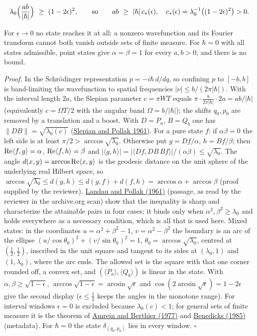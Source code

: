 \documentclass[11pt,a4paper]{article}
\begin{document}
\[\lambda_0\Bigl(\frac{ab}{|\hbar|}\Bigr)\ \ge\ (1-2\epsilon)^2,
\qquad\text{so}\qquad ab\ \ge\ |\hbar|\,c_*(\epsilon),\quad
c_*(\epsilon)=\lambda_0^{-1}\bigl((1-2\epsilon)^2\bigr)>0 .\]

For \(\epsilon\to0\) no state reaches it at all: a nonzero wavefunction
and its Fourier transform cannot both vanish outside sets of finite
measure. For \(\hbar=0\) with all states admissible, point states give
\(\alpha=\beta=1\) for every \(a,b>0\), and there is no bound.

\emph{Proof.} In the Schrödinger representation \(p=-i\hbar\,d/dq\), so
confining \(p\) to \([-b,b]\) is band-limiting the wavefunction to
spatial frequencies \(|\nu|\le b/(2\pi|\hbar|)\). With the interval
length \(2a\), the Slepian parameter \(c=\pi WT\) equals
\(\pi\cdot\frac b{2\pi|\hbar|}\cdot2a=ab/|\hbar|\) (equivalently
\(c=\Omega T/2\) with the angular band \(\Omega=b/|\hbar|\)); the shifts
\(q_0,p_0\) are removed by a translation and a boost. With \(D=P_a\),
\(B=Q_b\) one has \(\|DB\|=\sqrt{\lambda_0(c)}\)
(\href{https://doi.org/10.1002/j.1538-7305.1961.tb03976.x}{Slepian and
Pollak 1961}). For a pure state \(f\): if \(\alpha\beta=0\) the left
side is at least \(\pi/2>\arccos\sqrt{\lambda_0}\). Otherwise put
\(g=Df/\alpha\), \(h=Bf/\beta\); then
\({\rm Re}\langle f,g\rangle=\alpha\),
\({\rm Re}\langle f,h\rangle=\beta\) and
\(|\langle g,h\rangle|=|\langle Df,DB\,Bf\rangle|/(\alpha\beta)\le\sqrt{\lambda_0}\).
The angle \(d(x,y)=\arccos{\rm Re}\langle x,y\rangle\) is the geodesic
distance on the unit sphere of the underlying real Hilbert space, so
\(\arccos\sqrt{\lambda_0}\le d(g,h)\le d(g,f)+d(f,h)=\arccos\alpha+\arccos\beta\)
(proof supplied by the reviewer).
\href{https://doi.org/10.1002/j.1538-7305.1961.tb03977.x}{Landau and
Pollak (1961)} (passage, as read by the reviewer in the archive.org
scan) show that the inequality is sharp and characterize the attainable
pairs in four cases; it binds only when \(\alpha^2,\beta^2\ge\lambda_0\)
and holds everywhere as a necessary condition, which is all that is used
here. Mixed states: in the coordinates \(u=\alpha^2+\beta^2-1\),
\(v=\alpha^2-\beta^2\) the boundary is an arc of the ellipse
\((u/\cos\theta_0)^2+(v/\sin\theta_0)^2=1\),
\(\theta_0=\arccos\sqrt{\lambda_0}\), centred at \((\frac12,\frac12)\),
inscribed in the unit square and tangent to its sides at
\((\lambda_0,1)\) and \((1,\lambda_0)\), where the arc ends. The allowed
set is the square with that one corner rounded off, a convex set, and
\((\langle P_a\rangle,\langle Q_b\rangle)\) is linear in the state. With
\(\alpha,\beta\ge\sqrt{1-\epsilon}\),
\(\arccos\sqrt{1-\epsilon}=\arcsin\sqrt\epsilon\) and
\(\cos(2\arcsin\sqrt\epsilon)=1-2\epsilon\) give the second display
(\(\epsilon\le\frac12\) keeps the angles in the monotone range). For
interval windows \(\epsilon=0\) is excluded because \(\lambda_0(c)<1\);
for general sets of finite measure it is the theorem of
\href{https://doi.org/10.1016/0022-1236(77)90056-8}{Amrein and Berthier
(1977)} and
\href{https://doi.org/10.1016/0022-247X(85)90140-4}{Benedicks (1985)}
(metadata). For \(\hbar=0\) the state \(\delta_{(q_0,p_0)}\) lies in
every window. \(\square\)
\end{document}
